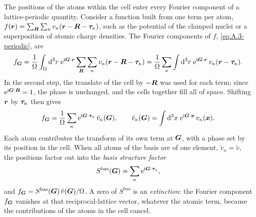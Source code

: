The positions of the atoms within the cell enter every Fourier component of a lattice-periodic quantity. Consider a function built from one term per atom, $f(\bm{r}) = \sum_{\bm{R}}\sum_\kappa v_\kappa(\bm{r} - \bm{R} - \bm{\tau}_\kappa)$, such as the potential of the clamped nuclei or a superposition of atomic charge densities. The Fourier components of $f$, \cref{eq:A.3-periodic}, are
\begin{equation*}
  f_{\bm{G}} = \frac{1}{\Omega}\int_\Omega\mathrm{d}^3r\;\mathrm{e}^{\mathrm{i}\bm{G}\cdot\bm{r}}\sum_{\bm{R}}\sum_\kappa v_\kappa(\bm{r} - \bm{R} - \bm{\tau}_\kappa)
  = \frac{1}{\Omega}\sum_\kappa\int\mathrm{d}^3r\;\mathrm{e}^{\mathrm{i}\bm{G}\cdot\bm{r}}\,v_\kappa(\bm{r} - \bm{\tau}_\kappa) .
\end{equation*}
In the second step, the translate of the cell by $-\bm{R}$ was used for each term; since $\mathrm{e}^{\mathrm{i}\bm{G}\cdot\bm{R}} = 1$, the phase is unchanged, and the cells together fill all of space. Shifting $\bm{r}$ by $\bm{\tau}_\kappa$ then gives
\begin{equation}
  f_{\bm{G}} = \frac{1}{\Omega}\sum_\kappa\mathrm{e}^{\mathrm{i}\bm{G}\cdot\bm{\tau}_\kappa}\,\tilde v_\kappa(\bm{G}),
  \qquad \tilde v_\kappa(\bm{G}) = \int\mathrm{d}^3x\;\mathrm{e}^{\mathrm{i}\bm{G}\cdot\bm{x}}\,v_\kappa(\bm{x}) .
  \label{eq:3.1-fG}
\end{equation}
Each atom contributes the transform of its own term at $\bm{G}$, with a phase set by its position in the cell. When all atoms of the basis are of one element, $\tilde v_\kappa = \tilde v$, the positions factor out into the \emph{basis structure factor}
\begin{equation}
  S^{\mathrm{bas}}(\bm{G}) = \sum_\kappa\mathrm{e}^{\mathrm{i}\bm{G}\cdot\bm{\tau}_\kappa},
  \label{eq:3.1-Sbas}
\end{equation}
and $f_{\bm{G}} = S^{\mathrm{bas}}(\bm{G})\,\tilde v(\bm{G})/\Omega$. A zero of $S^{\mathrm{bas}}$ is an \emph{extinction}: the Fourier component $f_{\bm{G}}$ vanishes at that reciprocal-lattice vector, whatever the atomic term, because the contributions of the atoms in the cell cancel.

